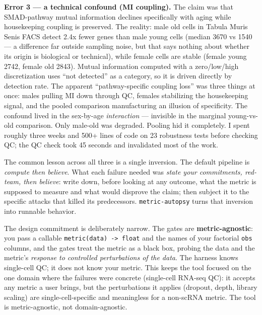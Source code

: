 \documentclass[
  11pt,
]{article}
\begin{document}
\textbf{Error 3 --- a technical confound (MI coupling).} The claim was
that SMAD-pathway mutual information declines specifically with aging
while housekeeping coupling is preserved. The reality: male old cells in
Tabula Muris Senis FACS detect 2.4x fewer genes than male young cells
(median 3670 vs 1540 --- a difference far outside sampling noise, but
that says nothing about whether its origin is biological or technical),
while female cells are stable (female young 2742, female old 2843).
Mutual information computed with a zero/low/high discretization uses
``not detected'' as a category, so it is driven directly by detection
rate. The apparent ``pathway-specific coupling loss'' was three things
at once: males pulling MI down through QC, females stabilizing the
housekeeping signal, and the pooled comparison manufacturing an illusion
of specificity. The confound lived in the sex-by-age \emph{interaction}
--- invisible in the marginal young-vs-old comparison. Only male-old was
degraded. Pooling hid it completely. I spent roughly three weeks and
500+ lines of code on 23 robustness tests before checking QC; the QC
check took 45 seconds and invalidated most of the work.

The common lesson across all three is a single inversion. The default
pipeline is \emph{compute then believe}. What each failure needed was
\emph{state your commitments, red-team, then believe}: write down,
before looking at any outcome, what the metric is supposed to measure
and what would disprove the claim; then subject it to the specific
attacks that killed its predecessors. \texttt{metric-autopsy} turns that
inversion into runnable behavior.

The design commitment is deliberately narrow. The gates are
\textbf{metric-agnostic}: you pass a callable
\texttt{metric(data)\ -\textgreater{}\ float} and the names of your
factorial \texttt{obs} columns, and the gates treat the metric as a
black box, probing the data and the metric's \emph{response to
controlled perturbations of the data}. The harness knows single-cell QC;
it does not know your metric. This keeps the tool focused on the one
domain where the failures were concrete (single-cell RNA-seq QC): it
accepts any metric a user brings, but the perturbations it applies
(dropout, depth, library scaling) are single-cell-specific and
meaningless for a non-scRNA metric. The tool is metric-agnostic, not
domain-agnostic.
\end{document}

